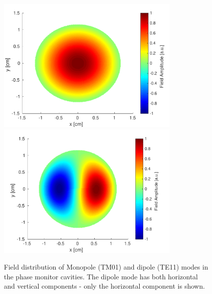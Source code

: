 \begin{figure}
  \centering
  \includegraphics[width=0.8\textwidth]{Figures/phaseMons/monopole}
  \includegraphics[width=0.8\textwidth]{Figures/phaseMons/dipole}
  \caption{Field distribution of Monopole (TM01) and dipole (TE11) modes in the phase monitor cavities. The dipole mode has both horizontal and vertical components - only the horizontal component is shown.}
  \label{f:transModes}
\end{figure}

